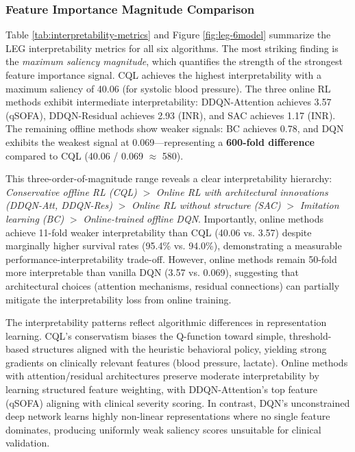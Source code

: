 \subsubsection{Feature Importance Magnitude Comparison}

Table \ref{tab:interpretability-metrics} and Figure \ref{fig:leg-6model} summarize the LEG interpretability metrics for all six algorithms. The most striking finding is the \textit{maximum saliency magnitude}, which quantifies the strength of the strongest feature importance signal. CQL achieves the highest interpretability with a maximum saliency of 40.06 (for systolic blood pressure). The three online RL methods exhibit intermediate interpretability: DDQN-Attention achieves 3.57 (qSOFA), DDQN-Residual achieves 2.93 (INR), and SAC achieves 1.17 (INR). The remaining offline methods show weaker signals: BC achieves 0.78, and DQN exhibits the weakest signal at 0.069—representing a \textbf{600-fold difference} compared to CQL (40.06 / 0.069 $\approx$ 580).

This three-order-of-magnitude range reveals a clear interpretability hierarchy: \textit{Conservative offline RL (CQL)} $>$ \textit{Online RL with architectural innovations (DDQN-Att, DDQN-Res)} $>$ \textit{Online RL without structure (SAC)} $>$ \textit{Imitation learning (BC)} $>$ \textit{Online-trained offline DQN}. Importantly, online methods achieve 11-fold weaker interpretability than CQL (40.06 vs. 3.57) despite marginally higher survival rates (95.4\% vs. 94.0\%), demonstrating a measurable performance-interpretability trade-off. However, online methods remain 50-fold more interpretable than vanilla DQN (3.57 vs. 0.069), suggesting that architectural choices (attention mechanisms, residual connections) can partially mitigate the interpretability loss from online training.

The interpretability patterns reflect algorithmic differences in representation learning. CQL's conservatism biases the Q-function toward simple, threshold-based structures aligned with the heuristic behavioral policy, yielding strong gradients on clinically relevant features (blood pressure, lactate). Online methods with attention/residual architectures preserve moderate interpretability by learning structured feature weighting, with DDQN-Attention's top feature (qSOFA) aligning with clinical severity scoring. In contrast, DQN's unconstrained deep network learns highly non-linear representations where no single feature dominates, producing uniformly weak saliency scores unsuitable for clinical validation.

